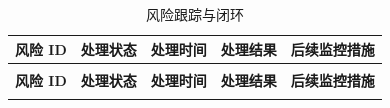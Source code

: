 \begin{longtable}{>{\centering\arraybackslash}m{1cm} >{\centering\arraybackslash}m{1.4cm} >{\centering\arraybackslash}m{1cm} >{\centering\arraybackslash}m{5cm} >{\centering\arraybackslash}m{4.5cm}}

    \caption{风险跟踪与闭环} \label{tab:training}                                                                                                                                                                                                                      \\

    \toprule
    \textbf{风险 ID} & \textbf{处理状态} & \textbf{处理时间} & \textbf{处理结果}                                                                                               & \textbf{后续监控措施}                                                                              \\
    \midrule
    \endfirsthead

    \multicolumn{5}{c}{{\tablename\ \thetable{} 续表}}                                                                                                                                                                                                            \\
    \toprule
    \textbf{风险 ID} & \textbf{处理状态} & \textbf{处理时间} & \textbf{处理结果}                                                                                               & \textbf{后续监控措施}                                                                              \\
    \midrule
    \endhead

    \bottomrule
    \endfoot



\end{longtable}
